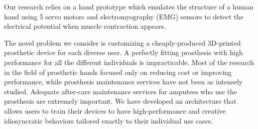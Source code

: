 Our research relies on a hand prototype \cite{3D1} which emulates the
structure of a human hand using 5 servo motors and electromyography
(EMG) sensors to detect the electrical potential when muscle
contraction appears.

The novel problem we consider is customizing a cheaply-produced
3D-printed prosthetic device for each diverse user.  A
perfectly fitting prosthesis with high performance for all the
different individuals is impracticable.  Most of the research in the
field of prosthetic hands focused only on reducing cost or improving
performance, while prosthesis maintenance services have not been as
intensely studied.  Adequate after-care maintenance services for
amputees who use the prosthesis are extremely important.  We have
developed an architecture that allows users to train their devices to
have high-performance and creative idiosyncratic behaviors tailored
exactly to their individual use cases.